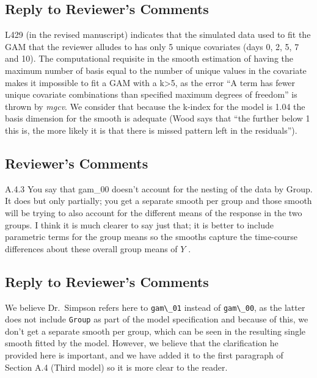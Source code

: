 \documentclass[
]{article}
\newcommand{\passthrough}[1]{#1}
\begin{document}
\hypertarget{section-10}{%
\subsection{\texorpdfstring{\textcolor{reviewersblue} {Reply to Reviewer's Comments}}{}}\label{section-10}}

L429 (in the revised manuscript) indicates that the simulated data used to fit the GAM that the reviewer alludes to has only 5 unique covariates (days 0, 2, 5, 7 and 10). The computational requisite in the smooth estimation of having the maximum number of basis equal to the number of unique values in the covariate makes it impossible to fit a GAM with a k\textgreater5, as the error ``A term has fewer unique covariate combinations than specified maximum degrees of freedom'' is thrown by \emph{mgcv}. We consider that because the k-index for the model is 1.04 the basis dimension for the smooth is adequate (Wood says that ``the further below 1 this is, the more likely it is that there is missed pattern left in the residuals'').

\hypertarget{reviewers-comments-10}{%
\subsection{Reviewer's Comments}\label{reviewers-comments-10}}

A.4.3 You say that gam\_00 doesn't account for the nesting of the data by Group. It does but only partially; you get a separate smooth per group and those smooth will be trying to also account for the different means of the response in the two groups. I think it is much clearer to say just that; it is better to include
parametric terms for the group means so the smooths capture the time-course differences about these overall group means of \(Y\) .

\hypertarget{section-11}{%
\subsection{\texorpdfstring{\textcolor{reviewersblue} {Reply to Reviewer's Comments}}{}}\label{section-11}}

We believe Dr.~Simpson refers here to \passthrough{\lstinline!gam\_01!} instead of \passthrough{\lstinline!gam\_00!}, as the latter does not include \passthrough{\lstinline!Group!} as part of the model specification and because of this, we don't get a separate smooth per group, which can be seen in the resulting single smooth fitted by the model. However, we believe that the clarification he provided here is important, and we have added it to the first paragraph of Section A.4 (Third model) so it is more clear to the reader.
\end{document}
